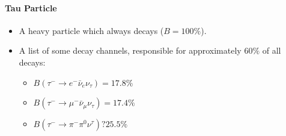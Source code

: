 \paragraph{Tau Particle}
\begin{itemize}
    \item A heavy particle which always decays ($B = 100 \%$).
    \item A list of some decay channels, responsible for approximately $60 \%$ of all decays:
    \begin{itemize}
        \item $B(τ^{-} → e^{-} \bar{ν}_{e} ν_{τ}) = 17.8 \%$
        \item $B(τ^{-} → μ^{-}\bar{ν}_{μ} ν_{τ}) = 17.4 \%$
        \item $B(τ^{-} → π^{-} π^{0} ν^{τ}) ? 25.5 \%$
    \end{itemize}
\end{itemize}

